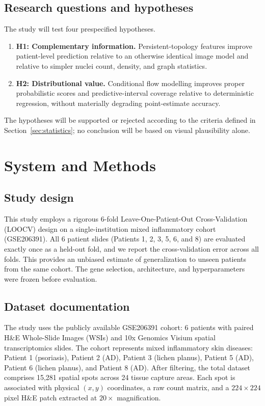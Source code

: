 \documentclass[nocrop]{bioinfo}
\begin{document}
\subsection{Research questions and hypotheses}

The study will test four prespecified hypotheses.

\begin{enumerate}
\item \textbf{H1: Complementary information.} Persistent-topology features
improve patient-level prediction relative to an otherwise identical image
model and relative to simpler nuclei count, density, and graph statistics.

\item \textbf{H2: Distributional value.} Conditional flow modelling improves
proper probabilistic scores and predictive-interval coverage relative to
deterministic regression, without materially degrading point-estimate
accuracy.
\end{enumerate}

The hypotheses will be supported or rejected according to the criteria
defined in Section~\ref{sec:statistics}; no conclusion will be based on visual
plausibility alone.

\section{System and Methods}

\subsection{Study design}

This study employs a rigorous 6-fold Leave-One-Patient-Out Cross-Validation (LOOCV) design on a single-institution mixed inflammatory cohort (GSE206391). All 6 patient slides (Patients 1, 2, 3, 5, 6, and 8) are evaluated exactly once as a held-out fold, and we report the cross-validation error across all folds. This provides an unbiased estimate of generalization to unseen patients from the same cohort. The gene selection, architecture, and hyperparameters were frozen before evaluation.

\subsection{Dataset documentation}

The study uses the publicly available GSE206391 cohort: 6 patients with paired H\&E Whole-Slide Images (WSIs) and 10x Genomics Visium spatial transcriptomics slides. The cohort represents mixed inflammatory skin diseases: Patient 1 (psoriasis), Patient 2 (AD), Patient 3 (lichen planus), Patient 5 (AD), Patient 6 (lichen planus), and Patient 8 (AD). After filtering, the total dataset comprises 15,281 spatial spots across 24 tissue capture areas. Each spot is associated with physical $(x, y)$ coordinates, a raw count matrix, and a $224 \times 224$ pixel H\&E patch extracted at $20\times$ magnification.
\end{document}
